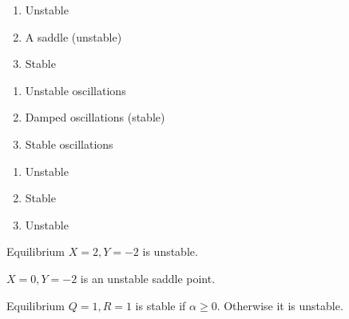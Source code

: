 \documentclass[]{memoir}
\begin{document}
\begin{enumerate}
\def\labelenumi{\arabic{enumi}.}
\itemsep1pt\parskip0pt
\item
  Unstable
\item
  A saddle (unstable)
\item
  Stable
\end{enumerate}


\begin{enumerate}
\def\labelenumi{\arabic{enumi}.}
\itemsep1pt\parskip0pt
\item
  Unstable oscillations
\item
  Damped oscillations (stable)
\item
  Stable oscillations
\end{enumerate}


\begin{enumerate}
\def\labelenumi{\arabic{enumi}.}
\itemsep1pt\parskip0pt
\item
  Unstable
\item
  Stable
\item
  Unstable
\end{enumerate}


Equilibrium $X=2, Y=-2$ is unstable.

$X=0, Y=-2$ is an unstable saddle point.


Equilibrium $Q=1, R=1$ is stable if $\alpha \geq 0$. Otherwise it is
unstable.
\end{document}
